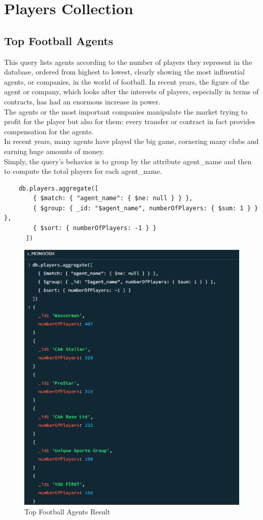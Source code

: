 \documentclass{Configuration_Files/PoliMi3i_thesis}
\begin{document}
\section{Players Collection}
\subsection{Top Football Agents}
This query lists agents according to the number of players they represent in the database, ordered from highest to lowest, clearly showing the most influential agents, or companies, in the world of football. In recent years, the figure of the agent or company, which looks after the interests of players, especially in terms of contracts, has had an enormous increase in power. \\
The agents or the most important companies manipulate the market trying to profit for the player but also for them: every transfer or contract in fact provides compensation for the agents.\\
In recent years, many agents have played the big game, cornering many clubs and earning huge amounts of money.\\
Simply, the query’s behavior is to group by the attribute agent\_name and then to compute the total players for each agent\_name.
\begin{verbatim}
    db.players.aggregate([
        { $match: { "agent_name": { $ne: null } } },
        { $group: { _id: "$agent_name", numberOfPlayers: { $sum: 1 } } }, 
        { $sort: { numberOfPlayers: -1 } }
      ])      
    \end{verbatim}
\begin{figure}[htbp]
    \centering
    \includegraphics[scale=0.8]{Images/Queries/Top_Footbal_Agents/agents.png}
    \caption{Top Football Agents Result}
\end{figure}
\end{document}
